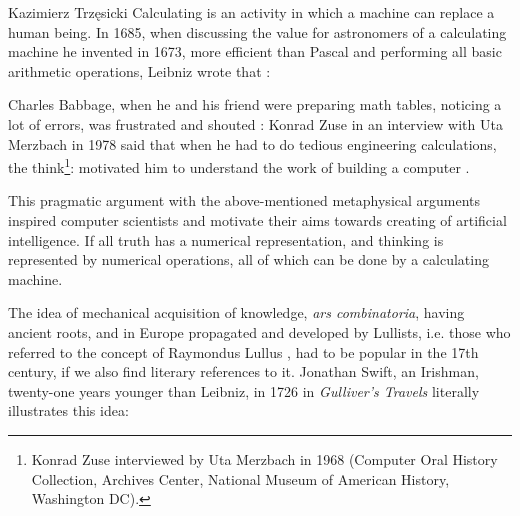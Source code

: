 \begin{artengenv}{Kazimierz Trzęsicki}
Calculating is an activity in which a machine can replace a human being. In 1685, when discussing the value for astronomers of a calculating machine he invented in 1673, more efficient than Pascal and performing all basic arithmetic operations, Leibniz \parencite*[p.181]{Leibniz1685} wrote that \parencite[Ch. I: Leibniz's Dream]{Davis2001}: 

Charles Babbage, when he and his friend were preparing math tables, noticing a lot of errors, was frustrated and shouted \parencite{Swade2002}:  Konrad Zuse in an interview with Uta Merzbach in 1978 said that when he had to do tedious engineering calculations, the think\footnote{Konrad Zuse interviewed by Uta Merzbach in 1968 (Computer Oral History Collection, Archives Center, National Museum of American History, Washington DC).}:  motivated him to understand the work of building a computer \parencite[p.449]{CopelandSprevakShagrir2017}.

This pragmatic argument with the above-mentioned metaphysical arguments inspired computer scientists and motivate their aims   towards creating of artificial intelligence.
If all truth has a numerical representation, and thinking is represented by numerical operations, all of which can be done by a calculating machine.

The idea of mechanical acquisition of knowledge, \emph{ars combinatoria}, having ancient roots, and in Europe propagated and developed by Lullists, i.e. those who referred to the concept of Raymondus Lullus \parencite{Trzesicki2020,Trzesicki2020a}, had to be popular in the 17th century, if we also find literary references to it. Jonathan Swift, an Irishman, twenty-one years younger than Leibniz, in 1726 in \emph{Gulliver's Travels} \parencite*{Swift1892} literally illustrates this idea: 



\end{artengenv}
